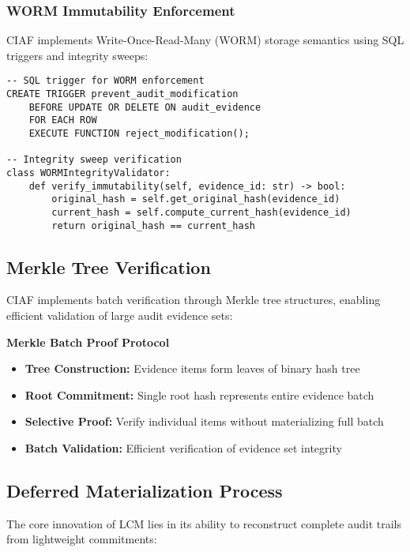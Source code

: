 \documentclass[12pt,a4paper]{article}
\begin{document}
\subsubsection{WORM Immutability Enforcement}

CIAF implements Write-Once-Read-Many (WORM) storage semantics using SQL triggers and integrity sweeps:

\begin{lstlisting}[caption=WORM Enforcement Implementation]
-- SQL trigger for WORM enforcement
CREATE TRIGGER prevent_audit_modification
    BEFORE UPDATE OR DELETE ON audit_evidence
    FOR EACH ROW
    EXECUTE FUNCTION reject_modification();

-- Integrity sweep verification
class WORMIntegrityValidator:
    def verify_immutability(self, evidence_id: str) -> bool:
        original_hash = self.get_original_hash(evidence_id)
        current_hash = self.compute_current_hash(evidence_id)
        return original_hash == current_hash
\end{lstlisting}

\subsection{Merkle Tree Verification}

CIAF implements batch verification through Merkle tree structures, enabling efficient validation of large audit evidence sets:

\begin{technicalbox}
\textbf{Merkle Batch Proof Protocol}
\begin{itemize}
\item \textbf{Tree Construction:} Evidence items form leaves of binary hash tree
\item \textbf{Root Commitment:} Single root hash represents entire evidence batch
\item \textbf{Selective Proof:} Verify individual items without materializing full batch
\item \textbf{Batch Validation:} Efficient verification of evidence set integrity
\end{itemize}
\end{technicalbox}

\subsection{Deferred Materialization Process}

The core innovation of LCM lies in its ability to reconstruct complete audit trails from lightweight commitments:
\end{document}
